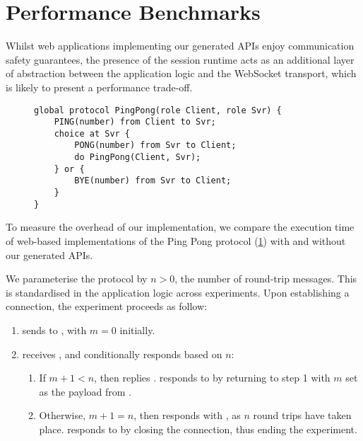 \section{Performance Benchmarks}
\label{section:benchmarks}

Whilst web applications implementing our generated APIs enjoy
communication safety guarantees, the presence of the session runtime acts
as an additional layer of abstraction between the application logic and the
WebSocket transport, which is likely to present a performance trade-off.

\begin{figure}[!ht]
\begin{lstlisting}[language=Scribble]
global protocol PingPong(role Client, role Svr) {
	PING(number) from Client to Svr;
	choice at Svr {
		PONG(number) from Svr to Client;
		do PingPong(Client, Svr);
	} or {
		BYE(number) from Svr to Client;	
	}
}
\end{lstlisting}
\label{lst:pingpong}
\end{figure}

To measure the overhead of our implementation, we compare the
execution time of web-based implementations of the
Ping Pong protocol (\cref{lst:pingpong}) with and without
our generated APIs.

We parameterise the  protocol by $n > 0$, the number of
round-trip messages. This is standardised in the application logic
across experiments.
Upon establishing a connection, the experiment proceeds as follow:

\begin{enumerate}

\item {} sends  to , 
with $m = 0$ initially.

\item {} receives , and
conditionally responds based on $n$:

\begin{enumerate}
\item If $m + 1 < n$, then  replies .
 responds to  by returning to
step 1 with $m$ set as the payload from .

\item Otherwise, $m + 1 = n$, then  responds with 
, as $n$ round trips have taken place. 
 responds to  by 
closing the connection, thus ending the experiment.
\end{enumerate}

\end{enumerate}

